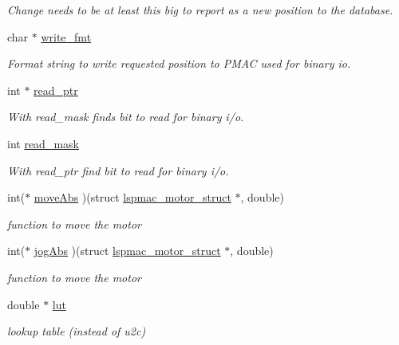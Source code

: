 \begin{DoxyCompactItemize}
\begin{DoxyCompactList}\small\item\em Change needs to be at least this big to report as a new position to the database. \end{DoxyCompactList}\item 
char $\ast$ \hyperlink{structlspmac__motor__struct_a70291ddfe7994c0bec7fc2287cb6dd89}{write\-\_\-fmt}
\begin{DoxyCompactList}\small\item\em Format string to write requested position to P\-M\-A\-C used for binary io. \end{DoxyCompactList}\item 
int $\ast$ \hyperlink{structlspmac__motor__struct_a844b28ccabab5048ca216db074fb9704}{read\-\_\-ptr}
\begin{DoxyCompactList}\small\item\em With read\-\_\-mask finds bit to read for binary i/o. \end{DoxyCompactList}\item 
int \hyperlink{structlspmac__motor__struct_a3c24ed30c5a3ad490c6139b2780b2af7}{read\-\_\-mask}
\begin{DoxyCompactList}\small\item\em With read\-\_\-ptr find bit to read for binary i/o. \end{DoxyCompactList}\item 
int($\ast$ \hyperlink{structlspmac__motor__struct_a38b6eee046c3ceff84f908af3335ebcf}{move\-Abs} )(struct \hyperlink{structlspmac__motor__struct}{lspmac\-\_\-motor\-\_\-struct} $\ast$, double)
\begin{DoxyCompactList}\small\item\em function to move the motor \end{DoxyCompactList}\item 
int($\ast$ \hyperlink{structlspmac__motor__struct_a86380d221e4b17eb8cf87a5ac656b669}{jog\-Abs} )(struct \hyperlink{structlspmac__motor__struct}{lspmac\-\_\-motor\-\_\-struct} $\ast$, double)
\begin{DoxyCompactList}\small\item\em function to move the motor \end{DoxyCompactList}\item 
double $\ast$ \hyperlink{structlspmac__motor__struct_a7b43671f7f3e06521f6cf91fb9ac707d}{lut}
\begin{DoxyCompactList}\small\item\em lookup table (instead of u2c) \end{DoxyCompactList}\item 

\end{DoxyCompactItemize}
